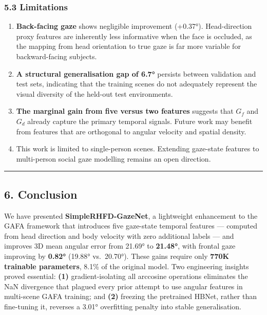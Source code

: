 \documentclass[
]{article}
\providecommand{\tightlist}{%
  \setlength{\itemsep}{0pt}\setlength{\parskip}{0pt}}
\begin{document}
\hypertarget{limitations}{%
\subsubsection{5.3 Limitations}\label{limitations}}

\begin{enumerate}
\def\labelenumi{\arabic{enumi}.}
\tightlist
\item
  \textbf{Back-facing gaze} shows negligible improvement (+0.37°).
  Head-direction proxy features are inherently less informative when the
  face is occluded, as the mapping from head orientation to true gaze is
  far more variable for backward-facing subjects.
\item
  \textbf{A structural generalisation gap of 6.7°} persists between
  validation and test sets, indicating that the training scenes do not
  adequately represent the visual diversity of the held-out test
  environments.
\item
  \textbf{The marginal gain from five versus two features} suggests that
  \(G_f\) and \(G_d\) already capture the primary temporal signals.
  Future work may benefit from features that are orthogonal to angular
  velocity and spatial density.
\item
  This work is limited to single-person scenes. Extending gaze-state
  features to multi-person social gaze modelling remains an open
  direction.
\end{enumerate}

\begin{center}\rule{0.5\linewidth}{0.5pt}\end{center}

\hypertarget{conclusion}{%
\subsection{6. Conclusion}\label{conclusion}}

We have presented \textbf{SimpleRHFD-GazeNet}, a lightweight enhancement
to the GAFA framework that introduces five gaze-state temporal features
--- computed from head direction and body velocity with zero additional
labels --- and improves 3D mean angular error from 21.69° to
\textbf{21.48°}, with frontal gaze improving by \textbf{0.82°} (19.88°
vs.~20.70°). These gains require only \textbf{770K trainable
parameters}, 8.1\% of the original model. Two engineering insights
proved essential: \textbf{(1)} gradient-isolating all arccosine
operations eliminates the NaN divergence that plagued every prior
attempt to use angular features in multi-scene GAFA training; and
\textbf{(2)} freezing the pretrained HBNet, rather than fine-tuning it,
reverses a 3.01° overfitting penalty into stable generalisation.
\end{document}
